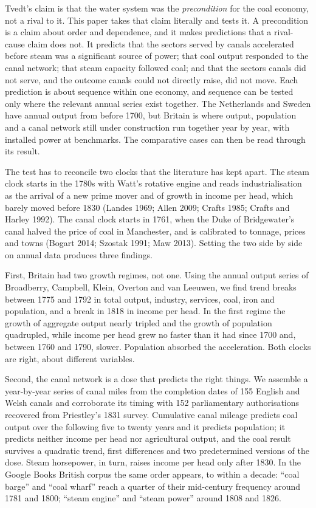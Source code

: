 \documentclass[
  11pt,
]{article}
\begin{document}
Tvedt's claim is that the water system was the \emph{precondition} for
the coal economy, not a rival to it. This paper takes that claim
literally and tests it. A precondition is a claim about order and
dependence, and it makes predictions that a rival-cause claim does not.
It predicts that the sectors served by canals accelerated before steam
was a significant source of power; that coal output responded to the
canal network; that steam capacity followed coal; and that the sectors
canals did not serve, and the outcome canals could not directly raise,
did not move. Each prediction is about sequence within one economy, and
sequence can be tested only where the relevant annual series exist
together. The Netherlands and Sweden have annual output from before
1700, but Britain is where output, population and a canal network still
under construction run together year by year, with installed power at
benchmarks. The comparative cases can then be read through its result.

The test has to reconcile two clocks that the literature has kept apart.
The steam clock starts in the 1780s with Watt's rotative engine and
reads industrialisation as the arrival of a new prime mover and of
growth in income per head, which barely moved before 1830 (Landes 1969;
Allen 2009; Crafts 1985; Crafts and Harley 1992). The canal clock starts
in 1761, when the Duke of Bridgewater's canal halved the price of coal
in Manchester, and is calibrated to tonnage, prices and towns (Bogart
2014; Szostak 1991; Maw 2013). Setting the two side by side on annual
data produces three findings.

First, Britain had two growth regimes, not one. Using the annual output
series of Broadberry, Campbell, Klein, Overton and van Leeuwen, we find
trend breaks between 1775 and 1792 in total output, industry, services,
coal, iron and population, and a break in 1818 in income per head. In
the first regime the growth of aggregate output nearly tripled and the
growth of population quadrupled, while income per head grew no faster
than it had since 1700 and, between 1760 and 1790, slower. Population
absorbed the acceleration. Both clocks are right, about different
variables.

Second, the canal network is a dose that predicts the right things. We
assemble a year-by-year series of canal miles from the completion dates
of 155 English and Welsh canals and corroborate its timing with 152
parliamentary authorisations recovered from Priestley's 1831 survey.
Cumulative canal mileage predicts coal output over the following five to
twenty years and it predicts population; it predicts neither income per
head nor agricultural output, and the coal result survives a quadratic
trend, first differences and two predetermined versions of the dose.
Steam horsepower, in turn, raises income per head only after 1830. In
the Google Books British corpus the same order appears, to within a
decade: ``coal barge'' and ``coal wharf'' reach a quarter of their
mid-century frequency around 1781 and 1800; ``steam engine'' and ``steam
power'' around 1808 and 1826.
\end{document}
